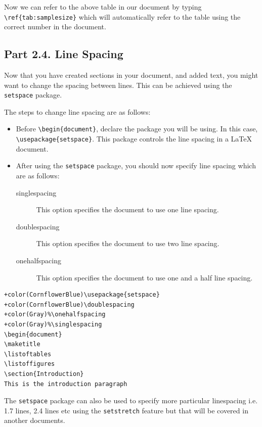 \documentclass[12pts]{report}
\begin{document}
Now we can refer to the above table in our document by typing \verb|\ref{tab:samplesize}| which will automatically refer to the table using the correct number in the document. 

\subsection*{Part 2.4. Line Spacing}

Now that you have created sections in your document, and added text, you might want to change the spacing between lines. This can be achieved using the \texttt{setspace} package. 

The steps to change line spacing are as follows:
\begin{itemize}
	\item Before \verb|\begin{document}|, declare the package you will be using. In this case, \verb|\usepackage{setspace}|. This package controls the line spacing in a {\LaTeX} document.
	\item After using the \texttt{setspace} package, you should now specify line spacing which are as follows:
	\begin{description}
		\item[singlespacing] This option specifies the document to use one line spacing.
		\item[doublespacing] This option specifies the document to use two line spacing.
		\item[onehalfspacing] This option specifies the document to use one and a half line spacing. 
	\end{description}
\end{itemize}
\begin{Verbatim}[commandchars=+\(\)]
+color(CornflowerBlue)\usepackage{setspace}
+color(CornflowerBlue)\doublespacing
+color(Gray)%\onehalfspacing
+color(Gray)%\singlespacing
\begin{document}
\maketitle
\listoftables
\listoffigures
\section{Introduction}
This is the introduction paragraph
\end{Verbatim}
The \texttt{setspace} package can also be used to specify more particular linespacing i.e. 1.7 lines, 2.4 lines etc using the \texttt{setstretch} feature but that will be covered in another documents. 
\end{document}
